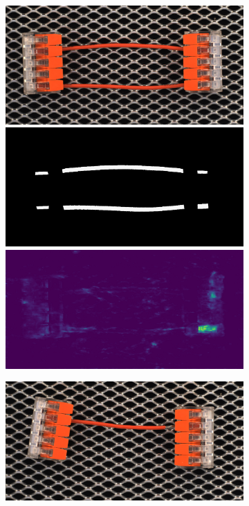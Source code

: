 \begin{figure}[H]
    \begin{subfigure}[b]{\textwidth}
        \centering
        \begin{minipage}{0.45\textwidth}
            \centering
            \includegraphics[width=\textwidth]{figures/appendix/appendix_DRAEM/SC/175.png}
            \includegraphics[width=\textwidth]{figures/appendix/appendix_DRAEM/SC/175m.png}
            \includegraphics[width=\textwidth]{figures/appendix/appendix_DRAEM/SC/175_mask.png}
        \end{minipage}
        \begin{minipage}{0.45\textwidth}
            \centering
            \includegraphics[width=\textwidth]{figures/appendix/appendix_DRAEM/SC/237.png}

\end{minipage}
\end{subfigure}
\end{figure}
